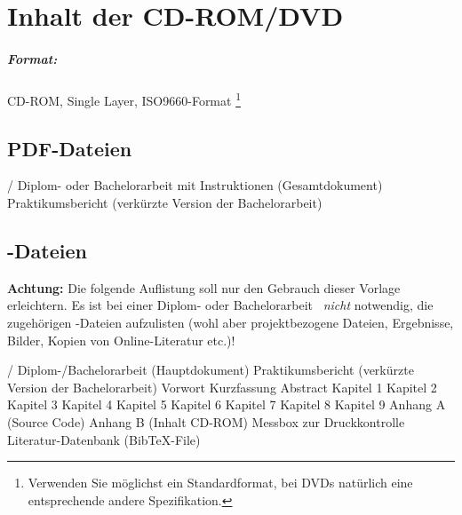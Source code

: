 \chapter{Inhalt der CD-ROM/DVD}
\label{app:cdrom}

\paragraph{Format:} 
		CD-ROM, Single Layer, ISO9660-Format%
\footnote{Verwenden Sie möglichst ein Standardformat, bei DVDs natürlich
eine entsprechende andere Spezifikation.}


\section{PDF-Dateien}
\begin{FileList}{/}
 Diplom- oder Bachelorarbeit mit Instruktionen (Gesamtdokument)
 Praktikumsbericht (verkürzte Version der Bachelorarbeit) %
\end{FileList}


\section{\latex-Dateien}

\textbf{Achtung:} Die folgende Auflistung soll nur den Gebrauch dieser Vorlage erleichtern. Es ist bei einer Diplom- oder Bachelorarbeit \ia\ \emph{nicht} notwendig, die zugehörigen \latex-Dateien aufzulisten (wohl aber projektbezogene Dateien, Ergebnisse, Bilder, Kopien von Online-Literatur etc.)!
\begin{FileList}{/}
 Diplom-/Bachelorarbeit (Hauptdokument) %
 Praktikumsbericht (verkürzte Version der Bachelorarbeit) %
 Vorwort %
 Kurzfassung %
 Abstract %
 Kapitel 1 %
 Kapitel 2 %
 Kapitel 3
 Kapitel 4 %
 Kapitel 5 %
 Kapitel 6 %
 Kapitel 7 %
 Kapitel 8 %
 Kapitel 9 %
 Anhang A (Source Code) %
 Anhang B (Inhalt CD-ROM) %
 Messbox zur Druckkontrolle %
 Literatur-Datenbank (BibTeX-File)
\end{FileList}

